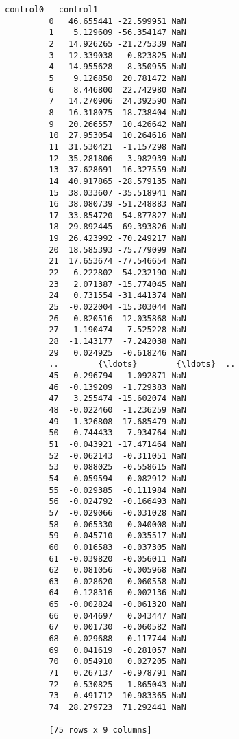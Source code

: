 \documentclass[11pt]{article}
\begin{document}
\begin{Verbatim}[commandchars=\\\{\}]
              control0   control1      
         0   46.655441 -22.599951 NaN  
         1    5.129609 -56.354147 NaN  
         2   14.926265 -21.275339 NaN  
         3   12.339038   0.823825 NaN  
         4   14.955628   8.350955 NaN  
         5    9.126850  20.781472 NaN  
         6    8.446800  22.742980 NaN  
         7   14.270906  24.392590 NaN  
         8   16.318075  18.738404 NaN  
         9   20.266557  10.426642 NaN  
         10  27.953054  10.264616 NaN  
         11  31.530421  -1.157298 NaN  
         12  35.281806  -3.982939 NaN  
         13  37.628691 -16.327559 NaN  
         14  40.917865 -28.579135 NaN  
         15  38.033607 -35.518941 NaN  
         16  38.080739 -51.248883 NaN  
         17  33.854720 -54.877827 NaN  
         18  29.892445 -69.393826 NaN  
         19  26.423992 -70.249217 NaN  
         20  18.585393 -75.779099 NaN  
         21  17.653674 -77.546654 NaN  
         22   6.222802 -54.232190 NaN  
         23   2.071387 -15.774045 NaN  
         24   0.731554 -31.441374 NaN  
         25  -0.022004 -15.303044 NaN  
         26  -0.820516 -12.035868 NaN  
         27  -1.190474  -7.525228 NaN  
         28  -1.143177  -7.242038 NaN  
         29   0.024925  -0.618246 NaN  
         ..        {\ldots}        {\ldots}  ..  
         45   0.296794  -1.092871 NaN  
         46  -0.139209  -1.729383 NaN  
         47   3.255474 -15.602074 NaN  
         48  -0.022460  -1.236259 NaN  
         49   1.326808 -17.685479 NaN  
         50   0.744433  -7.934764 NaN  
         51  -0.043921 -17.471464 NaN  
         52  -0.062143  -0.311051 NaN  
         53   0.088025  -0.558615 NaN  
         54  -0.059594  -0.082912 NaN  
         55  -0.029385  -0.111984 NaN  
         56  -0.024792  -0.166493 NaN  
         57  -0.029066  -0.031028 NaN  
         58  -0.065330  -0.040008 NaN  
         59  -0.045710  -0.035517 NaN  
         60   0.016583  -0.037305 NaN  
         61  -0.039820  -0.056011 NaN  
         62   0.081056  -0.005968 NaN  
         63   0.028620  -0.060558 NaN  
         64  -0.128316  -0.002136 NaN  
         65  -0.002824  -0.061320 NaN  
         66   0.044697   0.043447 NaN  
         67   0.001730  -0.060582 NaN  
         68   0.029688   0.117744 NaN  
         69   0.041619  -0.281057 NaN  
         70   0.054910   0.027205 NaN  
         71   0.267137  -0.978791 NaN  
         72  -0.530825   1.865043 NaN  
         73  -0.491712  10.983365 NaN  
         74  28.279723  71.292441 NaN  
         
         [75 rows x 9 columns]
\end{Verbatim}
            

    
    
    
    
\end{document}
